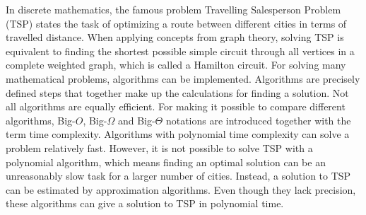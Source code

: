 
In discrete mathematics, the famous problem Travelling Salesperson Problem (TSP) states the task of optimizing a route between different cities in terms of travelled distance. 
When applying concepts from graph theory, solving TSP is equivalent to finding the shortest possible simple circuit through all vertices in a complete weighted graph, which is called a Hamilton circuit. 
For solving many mathematical problems, algorithms can be implemented. Algorithms are precisely defined steps that together make up the calculations for finding a solution. 
Not all algorithms are equally efficient. For making it possible to compare different algorithms, Big-$O$, Big-$\Omega$ and Big-$\Theta$ notations are introduced together with the term time complexity. 
Algorithms with polynomial time complexity can solve a problem relatively fast. 
However, it is not possible to solve TSP with a polynomial algorithm, which means finding an optimal solution can be an unreasonably slow task for a larger number of cities. 
Instead, a solution to TSP can be estimated by approximation algorithms.
Even though they lack precision, these algorithms can give a solution to TSP in polynomial time. 
